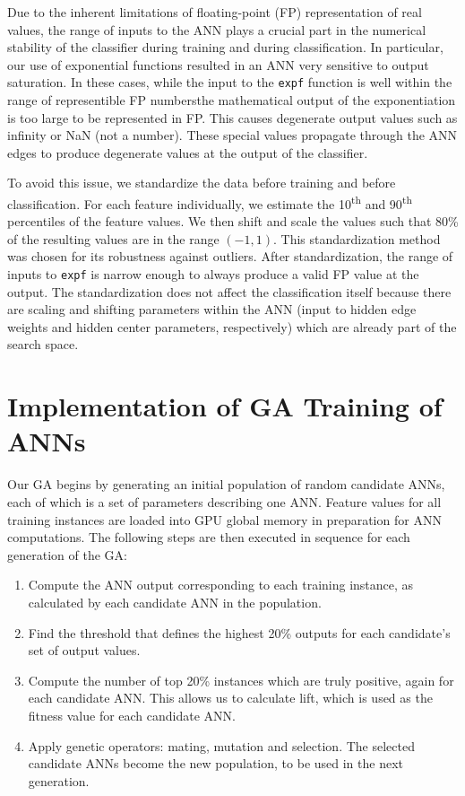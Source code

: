 \documentclass[11pt]{article}       %
\begin{document}
Due to the inherent limitations of floating-point (FP) representation of real values, the range of inputs to the ANN plays a crucial part in the numerical stability of the classifier during training and during classification. In particular, our use of exponential functions resulted in an ANN very sensitive to output saturation. In these cases, while the input to the \texttt{expf} function is well within the range of representible FP numbersthe mathematical output of the exponentiation is too large to be represented in FP. This causes degenerate output values such as infinity or NaN (not a number). These special values propagate through the ANN edges to produce degenerate values at the output of the classifier.

To avoid this issue, we standardize the data before training and before classification. For each feature individually, we estimate the 10\textsuperscript{th} and 90\textsuperscript{th} percentiles of the feature values. We then shift and scale the values such that 80\% of the resulting values are in the range $(-1, 1)$. This standardization method was chosen for its robustness against outliers. After standardization, the range of inputs to \texttt{expf} is narrow enough to always produce a valid FP value at the output. The standardization does not affect the classification itself because there are scaling and shifting parameters within the ANN (input to hidden edge weights and hidden center parameters, respectively) which are already part of the search space.

\section{Implementation of GA Training of ANNs} \label{algimp}

Our GA begins by generating an initial population of random candidate ANNs, each of which is a set of parameters describing one ANN. Feature values for all training instances are loaded into GPU global memory in preparation for ANN computations. The following steps are then executed in sequence for each generation of the GA:

\begin{enumerate}
	\item Compute the ANN output corresponding to each training instance, as calculated by each candidate ANN in the population.
	\item Find the threshold that defines the highest 20\% outputs for each candidate's set of output values.
	\item Compute the number of top 20\% instances which are truly positive, again for each candidate ANN. This allows us to calculate lift, which is used as the fitness value for each candidate ANN.
	\item Apply genetic operators: mating, mutation and selection. The selected candidate ANNs become the new population, to be used in the next generation.
\end{enumerate}
\end{document}
